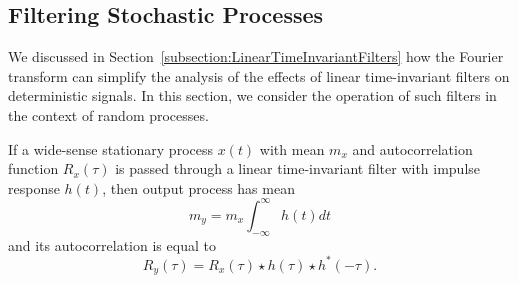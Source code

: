 \subsection{Filtering Stochastic Processes}

We discussed in Section~\ref{subsection:LinearTimeInvariantFilters} how the Fourier transform can simplify the analysis of the effects of linear time-invariant filters on deterministic signals.
In this section, we consider the operation of such filters in the context of random processes.

\begin{theorem}
If a wide-sense stationary process $x(t)$ with mean $m_x$ and autocorrelation function $R_x(\tau)$ is passed through a linear time-invariant filter with impulse response $h(t)$, then output process has mean
\begin{equation*}
m_y = m_x \int_{-\infty}^{\infty} h(t) dt
\end{equation*}
and its autocorrelation is equal to
\begin{equation*}
R_y (\tau) = R_x(\tau) \star h(\tau) \star h^*(-\tau) .
\end{equation*}
\end{theorem}
